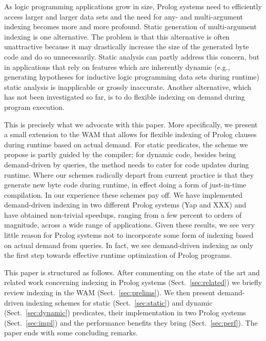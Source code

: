 \documentclass{llncs}
\newcommand{\JITI}{demand-driven indexing\xspace}
\begin{document}
As logic programming applications grow in size, Prolog systems need to
efficiently access larger and larger data sets and the need for any-
and multi-argument indexing becomes more and more profound. Static
generation of multi-argument indexing is one alternative. The problem
is that this alternative is often unattractive because it may
drastically increase the size of the generated byte code and do so
unnecessarily. Static analysis can partly address this concern, but in
applications that rely on features which are inherently dynamic (e.g.,
generating hypotheses for inductive logic programming data sets during
runtime) static analysis is inapplicable or grossly inaccurate.
Another alternative, which has not been investigated so far, is to do
flexible indexing on demand during program execution.

This is precisely what we advocate with this paper. More specifically,
we present a small extension to the WAM that allows for flexible
indexing of Prolog clauses during runtime based on actual demand. For
static predicates, the scheme we propose is partly guided by the
compiler; for dynamic code, besides being demand-driven by queries,
the method needs to cater for code updates during runtime. Where our
schemes radically depart from current practice is that they generate
new byte code during runtime, in effect doing a form of just-in-time
compilation. In our experience these schemes pay off. We have
implemented \JITI in two different Prolog systems (Yap and XXX) and
have obtained non-trivial speedups, ranging from a few percent to
orders of magnitude, across a wide range of applications. Given these
results, we see very little reason for Prolog systems not to
incorporate some form of indexing based on actual demand from queries.
In fact, we see \JITI as only the first step towards effective runtime
optimization of Prolog programs.

This paper is structured as follows. After commenting on the state of
the art and related work concerning indexing in Prolog systems
(Sect.~\ref{sec:related}) we briefly review indexing in the WAM
(Sect.~\ref{sec:prelims}). We then present \JITI schemes for static
(Sect.~\ref{sec:static}) and dynamic (Sect.~\ref{sec:dynamic})
predicates, their implementation in two Prolog systems
(Sect.~\ref{sec:impl}) and the performance benefits they bring
(Sect.~\ref{sec:perf}). The paper ends with some concluding remarks.
\end{document}

